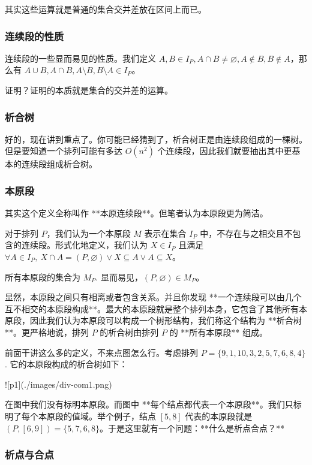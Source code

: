 \documentclass[12pt]{ctexart}
\begin{document}
其实这些运算就是普通的集合交并差放在区间上而已。

\subsubsection{连续段的性质}

连续段的一些显而易见的性质。我们定义 $A,B\in I_P,A \cap B \neq \varnothing,A \notin B,B \notin A$，那么有 $A\cup B,A\cap B,A\setminus B,B\setminus A\in I_P$。

证明？证明的本质就是集合的交并差的运算。

\subsubsection{析合树}

好的，现在讲到重点了。你可能已经猜到了，析合树正是由连续段组成的一棵树。但是要知道一个排列可能有多达 $O(n^2)$ 个连续段，因此我们就要抽出其中更基本的连续段组成析合树。

\subsubsection{本原段}

其实这个定义全称叫作 **本原连续段**。但笔者认为本原段更为简洁。

对于排列 $P$，我们认为一个本原段 $M$ 表示在集合 $I_P$ 中，不存在与之相交且不包含的连续段。形式化地定义，我们认为 $X\in I_P$ 且满足 $\forall A\in I_P,\ X\cap A= (P,\varnothing)\vee X\subseteq A\vee A\subseteq X$。

所有本原段的集合为 $M_P$. 显而易见，$(P,\varnothing)\in M_P$。

显然，本原段之间只有相离或者包含关系。并且你发现 **一个连续段可以由几个互不相交的本原段构成**。最大的本原段就是整个排列本身，它包含了其他所有本原段，因此我们认为本原段可以构成一个树形结构，我们称这个结构为 **析合树**。更严格地说，排列 $P$ 的析合树由排列 $P$ 的 **所有本原段** 组成。

前面干讲这么多的定义，不来点图怎么行。考虑排列 $P=\{9,1,10,3,2,5,7,6,8,4\}$. 它的本原段构成的析合树如下：

![p1](./images/div-com1.png)

在图中我们没有标明本原段。而图中 **每个结点都代表一个本原段**。我们只标明了每个本原段的值域。举个例子，结点 $[5,8]$ 代表的本原段就是 $(P,[6,9])=\{5,7,6,8\}$。于是这里就有一个问题：**什么是析点合点？**

\subsubsection{析点与合点}
\end{document}
